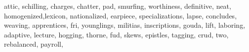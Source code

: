 \documentclass[
  12pt,
]{book}
\newenvironment{Shaded}{\begin{snugshade}}{\end{snugshade}}
\newcommand{\NormalTok}[1]{#1}
\newcommand{\StringTok}[1]{\textcolor[rgb]{0.31,0.60,0.02}{#1}}
\begin{document}
\begin{Shaded}
\begin{Highlighting}[]
                \StringTok{\textquotesingle{}attic\textquotesingle{}}\NormalTok{, }\StringTok{\textquotesingle{}schilling\textquotesingle{}}\NormalTok{, }\StringTok{\textquotesingle{}charges\textquotesingle{}}\NormalTok{, }\StringTok{\textquotesingle{}chatter\textquotesingle{}}\NormalTok{, }\StringTok{\textquotesingle{}pad\textquotesingle{}}\NormalTok{, }\StringTok{\textquotesingle{}smurfing\textquotesingle{}}\NormalTok{,}
                \StringTok{\textquotesingle{}worthiness\textquotesingle{}}\NormalTok{, }\StringTok{\textquotesingle{}definitive\textquotesingle{}}\NormalTok{, }\StringTok{\textquotesingle{}neat\textquotesingle{}}\NormalTok{, }\StringTok{\textquotesingle{}homogenized\textquotesingle{}}\NormalTok{,}\StringTok{\textquotesingle{}lexicon\textquotesingle{}}\NormalTok{,}
                \StringTok{\textquotesingle{}nationalized\textquotesingle{}}\NormalTok{, }\StringTok{\textquotesingle{}earpiece\textquotesingle{}}\NormalTok{, }\StringTok{\textquotesingle{}specializations\textquotesingle{}}\NormalTok{, }\StringTok{\textquotesingle{}lapse\textquotesingle{}}\NormalTok{,}
                \StringTok{\textquotesingle{}concludes\textquotesingle{}}\NormalTok{, }\StringTok{\textquotesingle{}weaving\textquotesingle{}}\NormalTok{, }\StringTok{\textquotesingle{}apprentices\textquotesingle{}}\NormalTok{, }\StringTok{\textquotesingle{}fri\textquotesingle{}}\NormalTok{, }\StringTok{\textquotesingle{}younglings\textquotesingle{}}\NormalTok{,}
                \StringTok{\textquotesingle{}militias\textquotesingle{}}\NormalTok{, }\StringTok{\textquotesingle{}inscriptions\textquotesingle{}}\NormalTok{, }\StringTok{\textquotesingle{}gouda\textquotesingle{}}\NormalTok{, }\StringTok{\textquotesingle{}lift\textquotesingle{}}\NormalTok{, }\StringTok{\textquotesingle{}laboring\textquotesingle{}}\NormalTok{, }
                \StringTok{\textquotesingle{}adaptive\textquotesingle{}}\NormalTok{, }\StringTok{\textquotesingle{}lecture\textquotesingle{}}\NormalTok{, }\StringTok{\textquotesingle{}hogging\textquotesingle{}}\NormalTok{, }\StringTok{\textquotesingle{}thorne\textquotesingle{}}\NormalTok{, }\StringTok{\textquotesingle{}fud\textquotesingle{}}\NormalTok{, }\StringTok{\textquotesingle{}skews\textquotesingle{}}\NormalTok{,}
                \StringTok{\textquotesingle{}epistles\textquotesingle{}}\NormalTok{, }\StringTok{\textquotesingle{}tagging\textquotesingle{}}\NormalTok{, }\StringTok{\textquotesingle{}crud\textquotesingle{}}\NormalTok{, }\StringTok{\textquotesingle{}two\textquotesingle{}}\NormalTok{, }\StringTok{\textquotesingle{}rebalanced\textquotesingle{}}\NormalTok{, }\StringTok{\textquotesingle{}payroll\textquotesingle{}}\NormalTok{,}

\end{Highlighting}
\end{Shaded}
\end{document}
